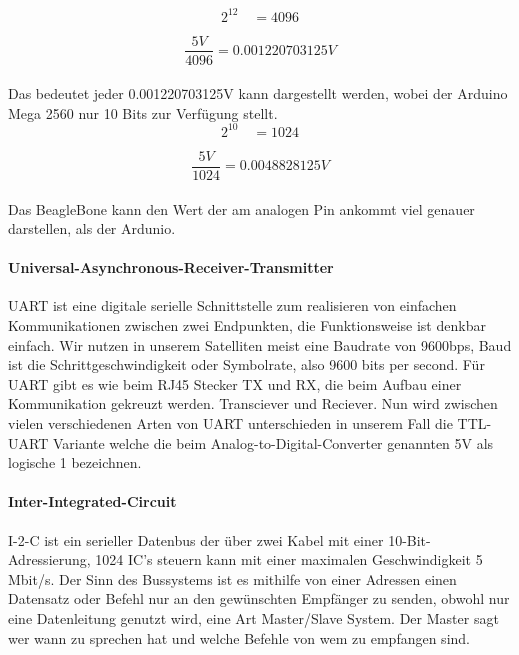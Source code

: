 \[
2^{12} \quad = 4096
\]

\[
\frac{5V}{4096} = 0.001220703125 V
\] \\

Das bedeutet jeder 0.001220703125V kann dargestellt werden, wobei der Arduino Mega 2560 nur 10 Bits zur Verfügung stellt. \\

\[
2^{10} \quad = 1024
\]

\[
\frac{5V}{1024} = 0.0048828125V
\] \\

Das BeagleBone kann den Wert der am analogen Pin ankommt viel genauer darstellen, als der Ardunio. 

\paragraph{Universal-Asynchronous-Receiver-Transmitter}
UART ist eine digitale serielle Schnittstelle zum realisieren von einfachen Kommunikationen zwischen zwei Endpunkten, die Funktionsweise ist denkbar einfach. Wir nutzen in unserem Satelliten meist eine Baudrate von 9600bps, Baud ist die Schrittgeschwindigkeit oder Symbolrate, also 9600 bits per second. Für UART gibt es wie beim RJ45 Stecker TX und RX, die beim Aufbau einer Kommunikation gekreuzt werden. Transciever und Reciever. Nun wird zwischen vielen verschiedenen Arten von UART unterschieden in unserem Fall die TTL-UART Variante welche die beim Analog-to-Digital-Converter genannten 5V als logische 1 bezeichnen. \\

\paragraph{Inter-Integrated-Circuit}
I-2-C ist ein serieller Datenbus der über zwei Kabel mit einer 10-Bit-Adressierung, 1024 IC's steuern kann mit einer maximalen Geschwindigkeit 5 Mbit/s. Der Sinn des Bussystems ist es mithilfe von einer Adressen einen Datensatz oder Befehl nur an den gewünschten Empfänger zu senden, obwohl nur eine Datenleitung genutzt wird, eine Art Master/Slave System. Der Master sagt wer wann zu sprechen hat und welche Befehle von wem zu empfangen sind.

